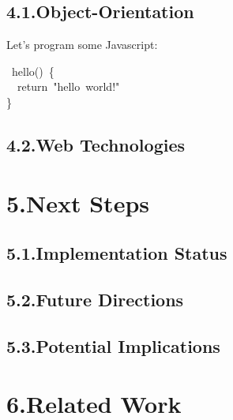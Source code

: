 \documentclass[preprint]{{sigplanconf}}
\begin{document}
\subsection{4.1.\hspace*{0.5em}Object-Orientation}\label{sec-object-orientation}%

\noindent Let's program some Javascript:%
\begin{mdpre}%
~hello()~\{\\
~~{return}~{"}{hello~world!}{"}\\
\}%
\end{mdpre}
\subsection{4.2.\hspace*{0.5em}Web Technologies}\label{sec-web-technologies}%

\section{5.\hspace*{0.5em}Next Steps}\label{sec-next-steps}%

\subsection{5.1.\hspace*{0.5em}Implementation Status}\label{sec-implementation-status}%

\subsection{5.2.\hspace*{0.5em}Future Directions}\label{sec-future-directions}%

\subsection{5.3.\hspace*{0.5em}Potential Implications}\label{sec-potential-implications}%

\section{6.\hspace*{0.5em}Related Work}\label{sec-related-work}%
\end{document}

